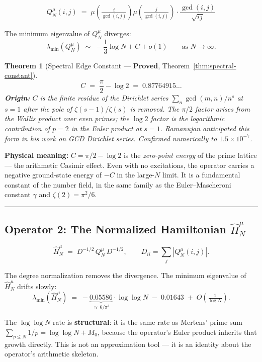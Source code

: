 \documentclass[12pt]{article}
\newtheorem{theorem}{Theorem}
\begin{document}
\[
  Q_N^{\mu}(i,j) \;=\; \mu\!\left(\tfrac{i}{\gcd(i,j)}\right)\mu\!\left(\tfrac{j}{\gcd(i,j)}\right)
  \cdot \frac{\gcd(i,j)}{\sqrt{ij}}
\]

The minimum eigenvalue of $Q_N^{\mu}$ diverges:
\[
  \lambda_{\min}(Q_N^{\mu}) \;\sim\; -\frac{1}{3}\log N + C + o(1)
  \qquad\text{as }N\to\infty.
\]

\begin{tcolorbox}[provedbox]
\begin{theorem}[Spectral Edge Constant --- \textbf{Proved}, Theorem~\ref{thm:spectral-constant}]
\[
  C \;=\; \frac{\pi}{2} - \log 2 \;=\; 0.87764915\ldots
\]
\textbf{Origin:} $C$ is the finite residue of the Dirichlet series
$\sum_n \gcd(m,n)/n^s$ at $s=1$ after the pole of $\zeta(s-1)/\zeta(s)$ is
removed. The $\pi/2$ factor arises from the Wallis product over even primes;
the $\log 2$ factor is the logarithmic contribution of $p=2$ in the Euler
product at $s=1$. Ramanujan anticipated this form in his work on GCD Dirichlet
series. Confirmed numerically to $1.5\times10^{-7}$.
\end{theorem}
\end{tcolorbox}

\noindent\textbf{Physical meaning:}
$C = \pi/2 - \log 2$ is the \emph{zero-point energy} of the prime lattice ---
the arithmetic Casimir effect. Even with no excitations, the operator carries
a negative ground-state energy of $-C$ in the large-$N$ limit.
It is a fundamental constant of the number field, in the same family as
the Euler--Mascheroni constant $\gamma$ and $\zeta(2) = \pi^2/6$.

\bigskip
\noindent\rule{\textwidth}{0.4pt}

\subsection*{Operator 2: The Normalized Hamiltonian $\hat{H}_N^{\mu}$}

\[
  \hat{H}_N^{\mu} \;=\; D^{-1/2}\, Q_N^{\mu}\, D^{-1/2},
  \qquad D_{ii} = \sum_j |Q_N^{\mu}(i,j)|.
\]

The degree normalization removes the divergence. The minimum eigenvalue of
$\hat{H}_N^{\mu}$ drifts slowly:
\[
  \lambda_{\min}(\hat{H}_N^{\mu})
  \;=\; -\underbrace{0.05586}_{\approx\,6/\pi^4}\cdot\log\log N
  \;-\; 0.01643 \;+\; O\!\left(\tfrac{1}{\log N}\right).
\]

The $\log\log N$ rate is \textbf{structural}: it is the same rate as
Mertens' prime sum $\sum_{p\le N}1/p = \log\log N + M_0$,
because the operator's Euler product inherits that growth directly.
This is not an approximation tool --- it is an identity about the operator's
arithmetic skeleton.
\end{document}
